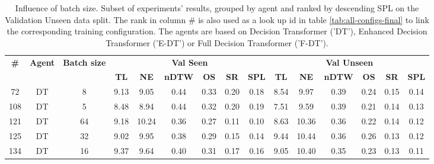\begin{table}
\centering
\caption{\label{tab:batch_test}Influence of batch size. Subset of experiments' results, grouped by agent and ranked by descending SPL on the Validation Unseen data split. The rank in column \# is also used as a look up id in table \ref{tab:all-configs-final} to link the corresponding training configuration.     \newline The agents are based on Decision Transformer ('DT'), Enhanced Decision Transformer ('E-DT') or Full Decision Transformer ('F-DT').}
\begin{tabular}{@{\hskip3pt}c@{\hskip3pt}c@{\hskip3pt}c@{\hskip3pt}c@{\hskip3pt}c@{\hskip3pt}c@{\hskip3pt}c@{\hskip3pt}c@{\hskip3pt}c@{\hskip3pt}c@{\hskip3pt}c@{\hskip3pt}c@{\hskip3pt}c@{\hskip3pt}c@{\hskip3pt}c}
\toprule
\textbf{\#} & \textbf{Agent} & \textbf{Batch size} & \multicolumn{6}{c}{\textbf{Val Seen}} & \multicolumn{6}{c}{\textbf{Val Unseen}} \\
\cmidrule(l){4-9} \cmidrule(l){10-15} \textbf{~} &     \textbf{~} &          \textbf{~} &       \textbf{TL} & \textbf{NE} & \textbf{nDTW} & \textbf{OS} & \textbf{SR} & \textbf{SPL} &         \textbf{TL} & \textbf{NE} & \textbf{nDTW} & \textbf{OS} & \textbf{SR} & \textbf{SPL} \\
\midrule
         72 &             DT &                   8 &              9.13 &        9.05 &          0.44 &        0.33 &        0.20 &         0.18 &                8.54 &        9.97 &          0.39 &        0.24 &        0.15 &         0.14 \\
        108 &             DT &                   5 &              8.48 &        8.94 &          0.44 &        0.32 &        0.20 &         0.19 &                7.51 &        9.59 &          0.39 &        0.21 &        0.14 &         0.13 \\
        121 &             DT &                  64 &              9.18 &       10.24 &          0.36 &        0.27 &        0.11 &         0.10 &                8.63 &       10.36 &          0.36 &        0.22 &        0.14 &         0.12 \\
        125 &             DT &                  32 &              9.02 &        9.95 &          0.38 &        0.29 &        0.15 &         0.14 &                9.44 &       10.44 &          0.36 &        0.26 &        0.13 &         0.12 \\
        134 &             DT &                  16 &              9.37 &        9.64 &          0.40 &        0.31 &        0.17 &         0.16 &                9.05 &       10.40 &          0.35 &        0.23 &        0.13 &         0.11 \\

\end{tabular}
\end{table}
